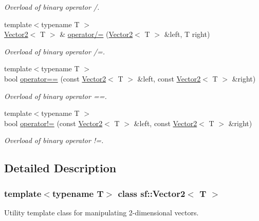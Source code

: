 \begin{DoxyCompactItemize}
\begin{DoxyCompactList}\small\item\em Overload of binary operator /. \end{DoxyCompactList}\item 
{\footnotesize template$<$typename T $>$ }\\\mbox{\hyperlink{classsf_1_1_vector2}{Vector2}}$<$ T $>$ \& \mbox{\hyperlink{classsf_1_1_vector2_ac4d293c9dc7954ccfd5e373972f38b03}{operator/=}} (\mbox{\hyperlink{classsf_1_1_vector2}{Vector2}}$<$ T $>$ \&left, T right)
\begin{DoxyCompactList}\small\item\em Overload of binary operator /=. \end{DoxyCompactList}\item 
{\footnotesize template$<$typename T $>$ }\\bool \mbox{\hyperlink{classsf_1_1_vector2_a9a7b2d36c3850828fdb651facfd25136}{operator==}} (const \mbox{\hyperlink{classsf_1_1_vector2}{Vector2}}$<$ T $>$ \&left, const \mbox{\hyperlink{classsf_1_1_vector2}{Vector2}}$<$ T $>$ \&right)
\begin{DoxyCompactList}\small\item\em Overload of binary operator ==. \end{DoxyCompactList}\item 
{\footnotesize template$<$typename T $>$ }\\bool \mbox{\hyperlink{classsf_1_1_vector2_a01673da35ef9c52d0e54b8263549a956}{operator!=}} (const \mbox{\hyperlink{classsf_1_1_vector2}{Vector2}}$<$ T $>$ \&left, const \mbox{\hyperlink{classsf_1_1_vector2}{Vector2}}$<$ T $>$ \&right)
\begin{DoxyCompactList}\small\item\em Overload of binary operator !=. \end{DoxyCompactList}\end{DoxyCompactItemize}


\subsection{Detailed Description}
\subsubsection*{template$<$typename T$>$\newline
class sf\+::\+Vector2$<$ T $>$}

Utility template class for manipulating 2-\/dimensional vectors. 


